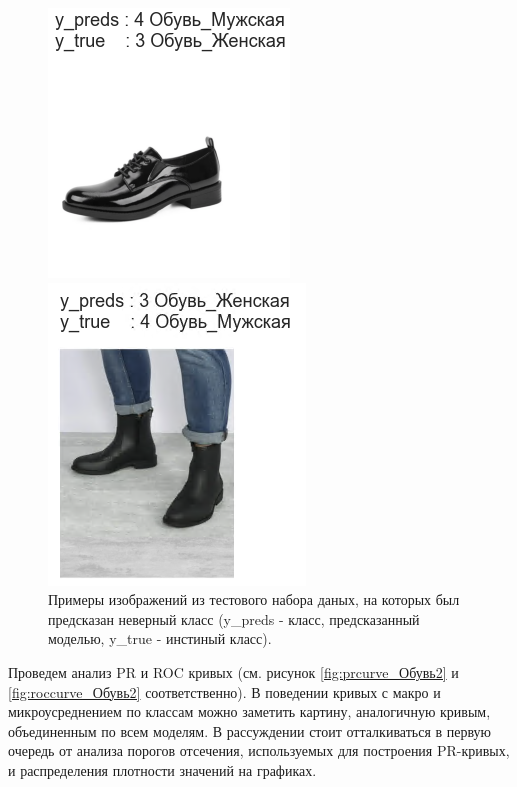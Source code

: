 \documentclass[a4paper,12pt]{extarticle}
\begin{document}
\begin{figure}[ht]
\begin{minipage}[b]{1.1in}
	\end{minipage}
	\hfill
	\begin{minipage}[b]{0.8in}
		\includegraphics[scale=0.4]{classification/classification_errorshoes4.png}
	\end{minipage}
	\hfill
	\begin{minipage}[b]{1in}
		\includegraphics[scale=0.4]{classification/classification_errorshoes5.png}
	\end{minipage}
	\caption{Примеры изображений из тестового набора даных, на которых был предсказан неверный класс (y\_preds - класс, предсказанный моделью, y\_true - инстиный класс).}
	\label{fig:classification_errorshoes}
\end{figure}

Проведем анализ PR и ROC кривых (см. рисунок \ref{fig:prcurve_Обувь2} и \ref{fig:roccurve_Обувь2} соответственно). В поведении кривых с макро и микроусреднением по классам можно заметить картину, аналогичную кривым, объединенным по всем моделям. В рассуждении стоит отталкиваться в первую очередь от анализа порогов отсечения, используемых для построения PR-кривых, и распределения плотности значений на графиках. 
\end{document}
